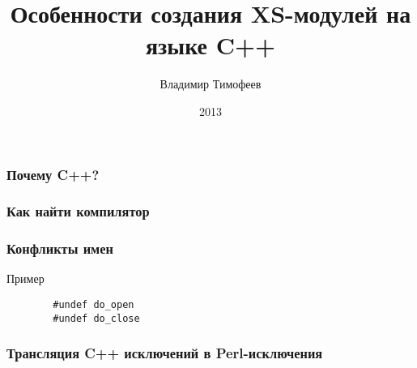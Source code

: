 \documentclass{beamer}
\title{Особенности создания XS-модулей на языке C++}
\author{Владимир Тимофеев}
\date{2013}
\begin{document}
\lstset{language=C}

\frame{\titlepage}
\begin{frame}
    \frametitle{Почему C++?}
\end{frame}
\begin{frame}
    \frametitle{Как найти компилятор}
\end{frame}
\begin{frame}[fragile]
    \frametitle{Конфликты имен}
    \begin{exampleblock}{Пример}
        \begin{lstlisting}
        #undef do_open
        #undef do_close
        \end{lstlisting}
    \end{exampleblock}
\end{frame}
\begin{frame}
    \frametitle{Трансляция C++ исключений в Perl-исключения}
\end{frame}
\end{document}
